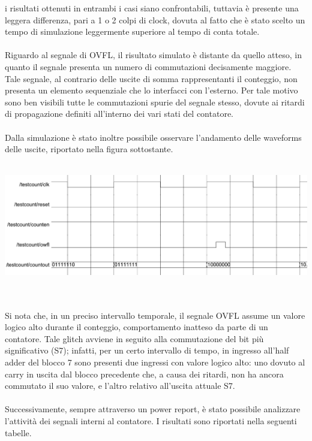 \documentclass[11pt,  english, makeidx, a4paper, titlepage, oneside]{book}
\begin{document}
i risultati ottenuti in entrambi i casi siano
confrontabili, tuttavia è presente una leggera differenza, pari
a 1 o 2 colpi di clock, dovuta al fatto che è stato scelto un 
tempo di simulazione leggermente superiore al tempo di conta 
totale.
\\\\
Riguardo al segnale di OVFL, il risultato simulato
è distante da quello atteso, in quanto il segnale presenta un numero di commutazioni
decisamente maggiore. Tale segnale, al contrario delle uscite di somma rappresentanti il conteggio, non 
presenta un elemento sequenziale che lo interfacci con l'esterno. Per tale motivo
sono ben visibili tutte le commutazioni spurie del segnale stesso, dovute ai ritardi
di propagazione definiti all'interno dei vari stati del contatore.
\\\\
Dalla simulazione è stato inoltre possibile osservare l'andamento 
delle waveforms delle uscite, riportato nella figura sottostante.
\\\\
\centerline{\includegraphics[width=15cm]{./img/Lab_1/Es_5/Glitch.png}}
\\\\
Si nota che, in
un preciso intervallo temporale, il segnale OVFL assume un valore 
logico alto durante il conteggio, comportamento inatteso da parte
di un contatore. 
Tale glitch avviene in seguito alla commutazione
del bit più significativo (S7); infatti, per un certo intervallo di tempo,
in ingresso all'half adder del blocco 7 sono presenti due ingressi con valore
logico alto: uno dovuto al carry in uscita dal blocco precedente che, a causa
dei ritardi, non ha ancora commutato il suo valore, e l'altro relativo all'uscita
attuale S7.
\\\\
Successivamente, sempre attraverso un power report, è stato possibile
analizzare l'attività dei segnali interni al contatore. I risultati sono 
riportati nella seguenti tabelle.
\\
\end{document}
